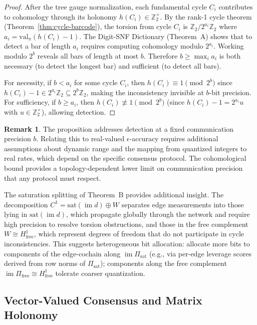 \documentclass[11pt]{amsart}
\theoremstyle{plain}
\theoremstyle{definition}
\newtheorem{remark}[theorem]{Remark}
\newcommand{\valpi}{\mathrm{val}_{\unif}}                   %
\newcommand{\unif}{\pi}                        %
\newcommand{\sat}{\mathrm{sat}}
\newcommand{\free}{\mathrm{free}}
\newcommand{\coboundary}{d}                           %
\DeclareMathOperator{\im}{im}                         %
\begin{document}
\begin{proof}
After the tree gauge normalization, each fundamental cycle $C_i$ contributes to cohomology through its holonomy $h(C_i) \in \mathbb{Z}_2^\times$. By the rank-1 cycle theorem (Theorem~\ref{thm:cycle-barcode}), the torsion from cycle $C_i$ is $\mathbb{Z}_2/2^{a_i}\mathbb{Z}_2$ where $a_i = \valpi(h(C_i)-1)$. The Digit-SNF Dictionary (Theorem~A) shows that to detect a bar of length $a_i$ requires computing cohomology modulo $2^{a_i}$. Working modulo $2^b$ reveals all bars of length at most $b$. Therefore $b \geq \max_i a_i$ is both necessary (to detect the longest bar) and sufficient (to detect all bars).

For necessity, if $b < a_i$ for some cycle $C_i$, then $h(C_i) \equiv 1 \pmod{2^b}$ since $h(C_i) - 1 \in 2^{a_i}\mathbb{Z}_2 \subseteq 2^b\mathbb{Z}_2$, making the inconsistency invisible at $b$-bit precision. For sufficiency, if $b \geq a_i$, then $h(C_i) \not\equiv 1 \pmod{2^b}$ (since $h(C_i) - 1 = 2^{a_i} u$ with $u \in \mathbb{Z}_2^\times$), allowing detection.
\end{proof}

\begin{remark}
The proposition addresses detection at a fixed communication precision $b$. Relating this to real-valued $\epsilon$-accuracy requires additional assumptions about dynamic range and the mapping from quantized integers to real rates, which depend on the specific consensus protocol. The cohomological bound provides a topology-dependent lower limit on communication precision that any protocol must respect.
\end{remark}

The saturation splitting of Theorem~B provides additional insight. The decomposition $C^1 = \sat(\im \coboundary) \oplus W$ separates edge measurements into those lying in $\sat(\im \coboundary)$, which propagate globally through the network and require high precision to resolve torsion obstructions, and those in the free complement $W \cong H^1_{\free}$, which represent degrees of freedom that do not participate in cycle inconsistencies. This suggests heterogeneous bit allocation: allocate more bits to components of the edge-cochain along $\im\Pi_{\sat}$ (e.g., via per-edge leverage scores derived from row norms of $\Pi_{\sat}$); components along the free complement $\im\Pi_{\free}\cong H^1_{\free}$ tolerate coarser quantization.

\subsection{Vector-Valued Consensus and Matrix Holonomy}
\label{ssec:vector-consensus}
\end{document}
